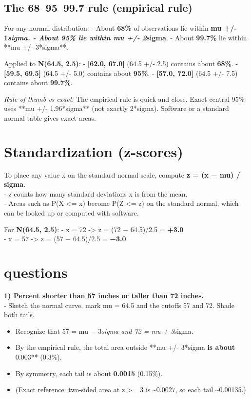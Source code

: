 \documentclass[
  letterpaper,
  DIV=11,
  numbers=noendperiod]{scrreprt}
\begin{document}
\subsection{The 68--95--99.7 rule (empirical
rule)}\label{the-689599.7-rule-empirical-rule}

For any normal distribution: - About \textbf{68\%} of observations lie
within \textbf{mu +/- 1\emph{sigma\textbf{. - About }95\%\textbf{ lie
within }mu +/- 2}sigma}. - About \textbf{99.7\%} lie within **mu +/-
3*sigma**.

Applied to \textbf{N(64.5, 2.5)}: - \textbf{{[}62.0, 67.0{]}} (64.5 +/-
2.5) contains about \textbf{68\%}. - \textbf{{[}59.5, 69.5{]}} (64.5 +/-
5.0) contains about \textbf{95\%}. - \textbf{{[}57.0, 72.0{]}} (64.5 +/-
7.5) contains about \textbf{99.7\%}.

\emph{Rule-of-thumb vs exact}: The empirical rule is quick and close.
Exact central 95\% uses **mu +/- 1.96*sigma** (not exactly 2*sigma).
Software or a standard normal table gives exact areas.

\section{Standardization (z-scores)}\label{standardization-z-scores}

To place any value x on the standard normal scale, compute \textbf{z =
(x − mu) / sigma}.\\
- z counts how many standard deviations x is from the mean.\\
- Areas such as P(X \textless= x) become P(Z \textless= z) on the
standard normal, which can be looked up or computed with software.

For \textbf{N(64.5, 2.5)}: - x = 72 -\textgreater{} z = (72 − 64.5)/2.5
= \textbf{+3.0}\\
- x = 57 -\textgreater{} z = (57 − 64.5)/2.5 = \textbf{−3.0}

\section{questions}\label{questions}

\textbf{1) Percent shorter than 57 inches or taller than 72 inches.}\\
- Sketch the normal curve, mark mu = 64.5 and the cutoffs 57 and 72.
Shade both tails.

\begin{itemize}
\item
  Recognize that 57 = mu − 3\emph{sigma and 72 = mu + 3}sigma.\\
\item
  By the empirical rule, the total area outside **mu +/- 3*sigma\textbf{
  is about }0.003** (0.3\%).
\item
  By symmetry, each tail is about \textbf{0.0015} (0.15\%).\\
\item
  (Exact reference: two-sided area at \textbar z\textbar{} \textgreater=
  3 is \textasciitilde0.0027, so each tail \textasciitilde0.00135.)
\end{itemize}
\end{document}
